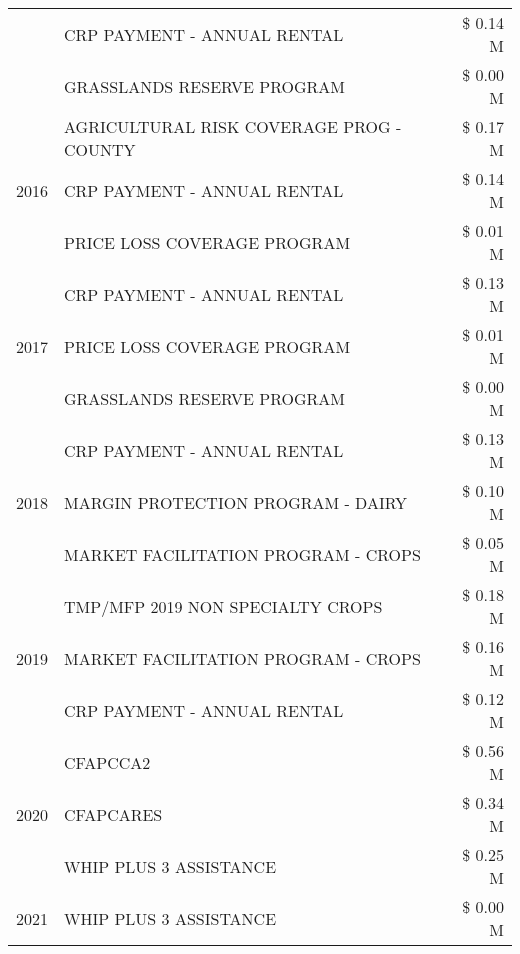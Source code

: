 \begin{tabular}{llr}
 & CRP PAYMENT - ANNUAL RENTAL & \$ 0.14 M \\
 & GRASSLANDS RESERVE PROGRAM & \$ 0.00 M \\
\cline{1-3}
\multirow[t]{3}{*}{2016} & AGRICULTURAL RISK COVERAGE PROG - COUNTY & \$ 0.17 M \\
 & CRP PAYMENT - ANNUAL RENTAL & \$ 0.14 M \\
 & PRICE LOSS COVERAGE PROGRAM & \$ 0.01 M \\
\cline{1-3}
\multirow[t]{3}{*}{2017} & CRP PAYMENT - ANNUAL RENTAL & \$ 0.13 M \\
 & PRICE LOSS COVERAGE PROGRAM & \$ 0.01 M \\
 & GRASSLANDS RESERVE PROGRAM & \$ 0.00 M \\
\cline{1-3}
\multirow[t]{3}{*}{2018} & CRP PAYMENT - ANNUAL RENTAL & \$ 0.13 M \\
 & MARGIN PROTECTION PROGRAM - DAIRY & \$ 0.10 M \\
 & MARKET FACILITATION PROGRAM - CROPS & \$ 0.05 M \\
\cline{1-3}
\multirow[t]{3}{*}{2019} & TMP/MFP 2019 NON SPECIALTY CROPS & \$ 0.18 M \\
 & MARKET FACILITATION PROGRAM - CROPS & \$ 0.16 M \\
 & CRP PAYMENT - ANNUAL RENTAL & \$ 0.12 M \\
\cline{1-3}
\multirow[t]{3}{*}{2020} & CFAPCCA2 & \$ 0.56 M \\
 & CFAPCARES & \$ 0.34 M \\
 & WHIP PLUS 3 ASSISTANCE & \$ 0.25 M \\
\cline{1-3}
2021 & WHIP PLUS 3 ASSISTANCE & \$ 0.00 M \\
\cline{1-3}
\bottomrule
\end{tabular}
